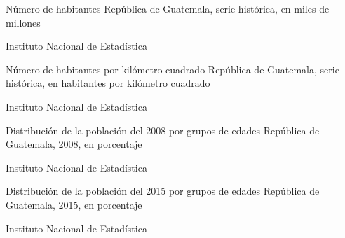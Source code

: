 
{%
 }%
{%
 Número de habitantes} %
{%
 República de Guatemala, serie histórica, en miles de millones} %
{%
 \begin{tikzpicture}[x=1pt,y=1pt]    \end{tikzpicture}}%
{%
 Instituto Nacional de Estadística} %





 {%
 }%
 {%
 	Número de habitantes por kilómetro cuadrado} %
 {%
 	República de Guatemala, serie histórica, en habitantes por kilómetro cuadrado} %
 {%
 	\begin{tikzpicture}[x=1pt,y=1pt]    \end{tikzpicture}}%
 {%
 	Instituto Nacional de Estadística} %
 
 
 
 
 

 {%
 }%
 {%
 	Distribución de la población del 2008 por grupos de edades} %
 {%
 	República de Guatemala, 2008, en porcentaje} %
 {%
 	\begin{tikzpicture}[x=1pt,y=1pt]    \end{tikzpicture}}%
 {%
 	Instituto Nacional de Estadística} %
 
 
 {%
 }%
 {%
 	Distribución de la población del 2015 por grupos de edades} %
 {%
 	República de Guatemala, 2015, en porcentaje} %
 {%
 	\begin{tikzpicture}[x=1pt,y=1pt]    \end{tikzpicture}}%
 {%
 	Instituto Nacional de Estadística} %
 
 
 
  
